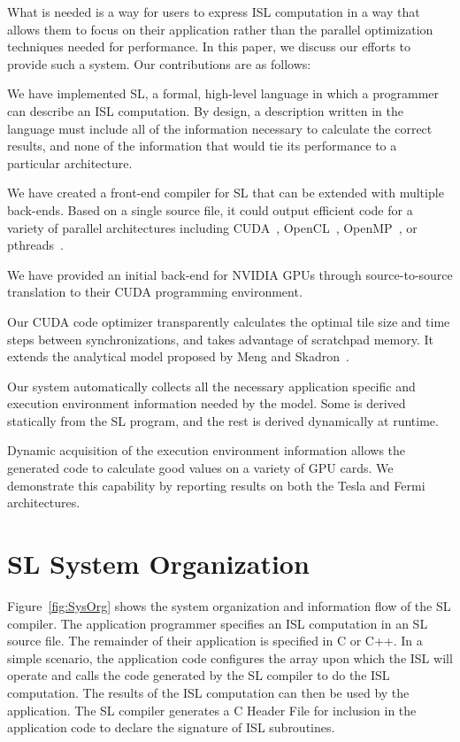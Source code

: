 \documentclass{sig-alternate}
\begin{document}
What is needed is a way for users to express ISL computation in a way that
allows them to focus on their application rather than the parallel
optimization techniques needed for performance.  In this paper, we discuss
our efforts to provide such a system.  Our contributions are as follows:

\begin{itemize*}
\item We have implemented SL, a formal, high-level language in which a
  programmer can describe an ISL computation.  By design, a description
  written in the language must include all of the information necessary to
  calculate the correct results, and none of the information that would tie
  its performance to a particular architecture.
\item We have created a front-end compiler for SL that can be extended with
  multiple back-ends.  Based on a single source file, it could output
  efficient code for a variety of parallel architectures including
  CUDA~\cite{CUDA1, CUDA2}, OpenCL~\cite{OpenCL}, Open\-MP~\cite{OpenMP}, or
  pthreads~\cite{pthreads}.
\item We have provided an initial back-end for NVIDIA GPUs through
  source-to-source translation to their CUDA programming environment.
\item Our CUDA code optimizer transparently calculates the optimal tile size
  and time steps between synchronizations, and takes advantage of scratchpad
  memory.  It extends the analytical model proposed by Meng and
  Skadron~\cite{meng}.
\item Our system automatically collects all the necessary application
  specific and execution environment information needed by the model.  Some
  is derived statically from the SL program, and the rest is derived
  dynamically at runtime.
\item Dynamic acquisition of the execution environment information allows the
  generated code to calculate good values on a variety of GPU cards.  We
  demonstrate this capability by reporting results on both the Tesla and
  Fermi architectures.
\end{itemize*}

\section{SL System Organization}

Figure~\ref{fig:SysOrg} shows the system organization and information flow of
the SL compiler.  The application programmer specifies an ISL computation in
an SL source file.  The remainder of their application is specified in C or
C++.  In a simple scenario, the application code configures the array upon
which the ISL will operate and calls the code generated by the SL compiler to
do the ISL computation.  The results of the ISL computation can then be used
by the application.  The SL compiler generates a C Header File for inclusion
in the application code to declare the signature of ISL subroutines.
\end{document}
